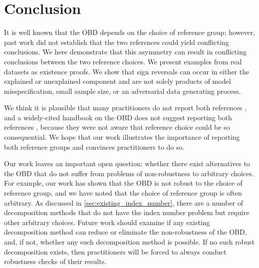 \section{Conclusion}
\label{sec:conclusion}

It is well known that the OBD depends on the choice of reference group; however, past work did not establish that the two references could yield conflicting conclusions. 
We here demonstrate that this asymmetry can result in conflicting conclusions between the two reference choices.
We present examples from real datasets as existence proofs. 
We show that sign reversals can occur in either the explained or unexplained component and are not solely products of model misspecification, small sample size, or an adversarial data generating process.

We think it is plausible that many practitioners do not report both references \citep{zhang_2019, ayubiShahbaziKhazaei2024,paradaContzen2025,singleton2016,lamJamiesonMittinty2021,leythienne2021paygapeu,alHanawiNjagi2022,tao2024gender}, and a widely-cited handbook on the OBD does not suggest reporting both references \citep{fortinLemieuxFirpo2011}, because they were not aware that reference choice could be so consequential.
We hope that our work illustrates the importance of reporting both reference groups and convinces practitioners to do so.

Our work leaves an important open question: whether there exist alternatives to the OBD that do not suffer from problems of non-robustness to arbitrary choices.
For example, our work has shown that the OBD is not robust to the choice of reference group, and we have noted that the choice of reference group is often arbitrary.
As discussed in \cref{sec:existing_index_number}, there are a number of decomposition methods that do not have the index number problem but require other arbitrary choices.
Future work should examine if any existing decomposition method can reduce or eliminate the non-robustness of the OBD, and, if not, whether any such decomposition method is possible.
If no such robust decomposition exists, then practitioners will be forced to always conduct robustness checks of their results.


